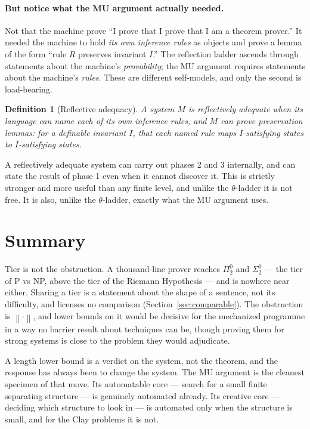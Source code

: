 \documentclass[11pt,a4paper]{article}
\newtheorem{definition}{Definition}
\newcommand{\Sig}[2]{\Sigma^{#1}_{#2}}
\newcommand{\Pai}[2]{\Pi^{#1}_{#2}}
\newcommand{\shortest}[1]{\left\lVert #1 \right\rVert}
\begin{document}
\paragraph{But notice what the MU argument actually needed.} Not that the
machine prove ``I prove that I prove that I am a theorem prover.'' It needed
the machine to hold \emph{its own inference rules} as objects and prove a lemma
of the form ``rule $R$ preserves invariant $I$.'' The reflection ladder ascends
through statements about the machine's \emph{provability}; the MU argument
requires statements about the machine's \emph{rules}. These are different
self-models, and only the second is load-bearing.

\begin{definition}[Reflective adequacy]
A system $M$ is \emph{reflectively adequate} when its language can name each of
its own inference rules, and $M$ can prove preservation lemmas: for a definable
invariant $I$, that each named rule maps $I$-satisfying states to
$I$-satisfying states.
\end{definition}

A reflectively adequate system can carry out phases 2 and 3 internally, and can
state the result of phase 1 even when it cannot discover it. This is strictly
stronger and more useful than any finite level, and unlike the $\theta$-ladder
it is not free. It is also, unlike the $\theta$-ladder, exactly what the MU
argument uses.

\section{Summary}

Tier is not the obstruction. A thousand-line prover reaches $\Pai{0}{2}$ and
$\Sig{0}{2}$ --- the tier of P vs NP, above the tier of the Riemann Hypothesis
--- and is nowhere near either. Sharing a tier is a statement about the shape of
a sentence, not its difficulty, and licenses no comparison
(Section~\ref{sec:comparable}). The obstruction is $\shortest{\cdot}$, and
lower bounds on it would be decisive for the mechanized programme in a way no
barrier result about techniques can be, though proving them for strong systems
is close to the problem they would adjudicate.

A length lower bound is a verdict on the system, not the theorem, and the
response has always been to change the system. The MU argument is the cleanest
specimen of that move. Its automatable core --- search for a small finite
separating structure --- is genuinely automated already. Its creative core ---
deciding which structure to look in --- is automated only when the structure is
small, and for the Clay problems it is not.
\end{document}
